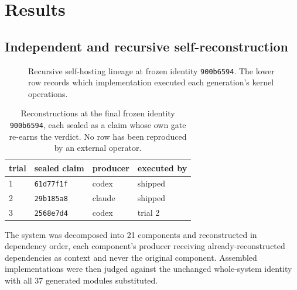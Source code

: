 \documentclass[10pt,twocolumn]{article}
\begin{document}
\section{Results}
\label{sec:results}

\subsection{Independent and recursive self-reconstruction}
\label{sec:selfhost}

\begin{figure}[t]
\centering

\caption{Recursive self-hosting lineage at frozen identity
\texttt{900b6594}. The lower row records which implementation executed
each generation's kernel operations.}
\label{fig:lineage}
\end{figure}

\begin{table}[t]
\centering\small
\caption{Reconstructions at the final frozen identity
\texttt{900b6594}, each sealed as a claim whose own gate re-earns the
verdict. No row has been reproduced by an external operator.}
\label{tab:trials}
\begin{tabular}{@{}llll@{}}
\toprule
trial & sealed claim & producer & executed by \\
\midrule
1 & \texttt{61d77f1f} & codex & shipped \\
2 & \texttt{29b185a8} & claude & shipped \\
3 & \texttt{2568e7d4} & codex & trial 2 \\
\bottomrule
\end{tabular}
\end{table}

The system was decomposed into 21 components and reconstructed in
dependency order, each component's producer receiving already-reconstructed
dependencies as context and never the original component. Assembled
implementations were then judged against the unchanged whole-system
identity with all 37 generated modules substituted.
\end{document}
